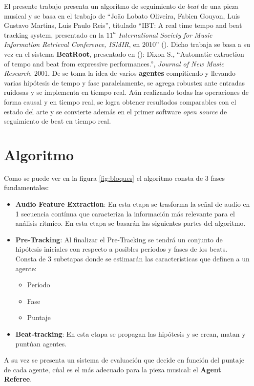 \documentclass[12pt,a4paper,titlepage]{report}
\begin{document}
El presente trabajo presenta un algoritmo de seguimiento de \emph{beat} de una pieza musical y se basa en el trabajo de ``Jo\~ao Lobato Oliveira, Fabien Gouyon, Luis Gustavo Martins, Luis Paulo Reis'', titulado ``IBT: A real time tempo and beat tracking system, presentado en la \emph{$11^a$ International Society for Music Information Retrieval Conference, ISMIR}, en 2010'' (\cite{bib:el_posta}). Dicho trabaja se basa a su vez en el sistema \textbf{BeatRoot}, presentado en (\cite{bib:dixon}): Dixon S., ``Automatic extraction of tempo and beat from expressive performances.'', \emph{Journal of New Music Research}, 2001. De \cite{bib:dixon} se toma la idea de varios \textbf{agentes} compitiendo y llevando varias hipótesis de tempo y fase paralelamente, se agrega robustez ante entradas ruidosas y se implementa en tiempo real. Aún realizando todas las operaciones de forma causal y en tiempo real, se logra obtener resultados comparables con el estado del arte y se convierte además en el primer software \emph{open source} de seguimiento de beat en tiempo real.


\chapter{Algoritmo}

Como se puede ver en la figura \ref{fig:bloques} el algoritmo consta de 3 fases fundamentales:
\begin{itemize}
\item \textbf{Audio Feature Extraction}: En esta etapa se trasforma la señal de audio en 1 secuencia contínua que caracteriza la información más relevante para el análisis rítmico. En esta etapa se basarán las siguientes partes del algoritmo.
\item \textbf{Pre-Tracking}: Al finalizar el Pre-Tracking se tendrá un conjunto de hipótesis iniciales con respecto a posibles períodos y fases de los beats. Consta de 3 subetapas donde se estimarán las características que definen a un agente:
\begin{itemize}
\item Período
\item Fase
\item Puntaje
\end{itemize}
\item \textbf{Beat-tracking}: En esta etapa se propagan las hipótesis y se crean, matan y puntúan agentes.
\end{itemize}

A su vez se presenta un sistema de evaluación que decide en función del puntaje de cada agente, cúal es el más adecuado para la pieza musical: el \textbf{Agent Referee}.
\end{document}
